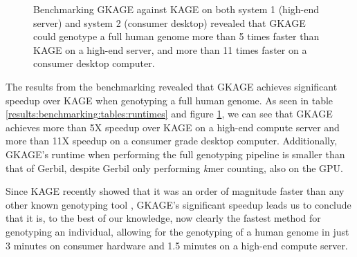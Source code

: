 %
\begin{figure}[H]
\centering
\caption{
  Benchmarking GKAGE against KAGE on both system 1 (high-end server) and system 2 (consumer desktop) revealed that GKAGE could genotype a full human genome more than 5 times faster than KAGE on a high-end server, and more than 11 times faster on a consumer desktop computer.
}
\label{results:benchmarking:figures:runtimes}
\end{figure}
%

The results from the benchmarking revealed that GKAGE achieves significant speedup over KAGE when genotyping a full human genome.
As seen in table \ref{results:benchmarking:tables:runtimes} and figure \ref{results:benchmarking:figures:runtimes}, we can see that GKAGE achieves more than 5X speedup over KAGE on a high-end compute server and more than 11X speedup on a consumer grade desktop computer.
Additionally, GKAGE's runtime when performing the full genotyping pipeline is smaller than that of Gerbil, despite Gerbil only performing \textit{k}mer counting, also on the GPU.

Since KAGE recently showed that it was an order of magnitude faster than any other known genotyping tool \cite{kage}, GKAGE's significant speedup leads us to conclude that it is, to the best of our knowledge, now clearly the fastest method for genotyping an individual, allowing for the genotyping of a human genome in just 3 minutes on consumer hardware and 1.5 minutes on a high-end compute server.
